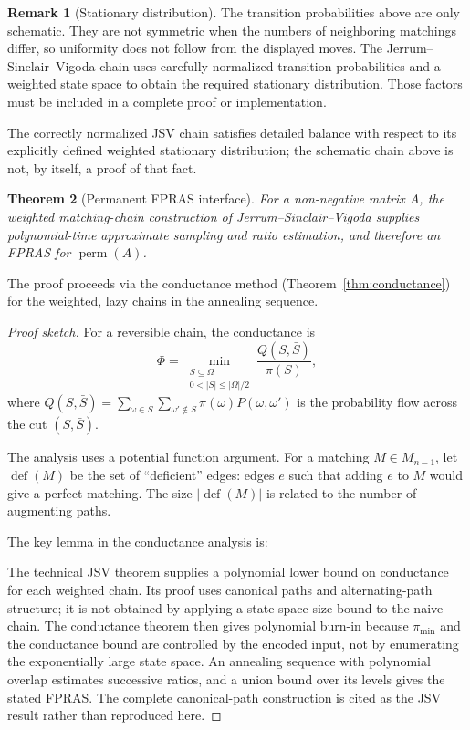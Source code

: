 \documentclass[twoside,12pt]{book}
\theoremstyle{plain}
\newtheorem{theorem}{Theorem}[chapter]
\theoremstyle{definition}
\newtheorem{remark}[theorem]{Remark}
\theoremstyle{remark}
\begin{document}
\begin{remark}[Stationary distribution]
The transition probabilities above are only schematic. They are not symmetric
when the numbers of neighboring matchings differ, so uniformity does not
follow from the displayed moves. The Jerrum--Sinclair--Vigoda chain uses
carefully normalized transition probabilities and a weighted state space to
obtain the required stationary distribution. Those factors must be included
in a complete proof or implementation.
\end{remark}

The correctly normalized JSV chain satisfies detailed balance with respect to
its explicitly defined weighted stationary distribution; the schematic chain
above is not, by itself, a proof of that fact.

\begin{theorem}[Permanent FPRAS interface]
\label{thm:jsv-mixing}
For a non-negative matrix $A$, the weighted matching-chain construction of
Jerrum--Sinclair--Vigoda supplies polynomial-time approximate sampling and
ratio estimation, and therefore an FPRAS for $\operatorname{perm}(A)$.
\end{theorem}

The proof proceeds via the conductance method (Theorem~\ref{thm:conductance})
for the weighted, lazy chains in the annealing sequence.

\begin{proof}[Proof sketch]
For a reversible chain, the conductance is
\[
\Phi = \min_{\substack{S \subseteq \Omega \\ 0 < |S| \leq |\Omega|/2}} \frac{Q(S, \bar{S})}{\pi(S)},
\]
where $Q(S, \bar{S}) = \sum_{\omega \in S} \sum_{\omega' \notin S} \pi(\omega) P(\omega, \omega')$ is the probability flow across the cut $(S, \bar{S})$.

The analysis uses a potential function argument. For a matching $M \in M_{n-1}$, let $\operatorname{def}(M)$ be the set of ``deficient'' edges: edges $e$ such that adding $e$ to $M$ would give a perfect matching. The size $|\operatorname{def}(M)|$ is related to the number of augmenting paths.

The key lemma in the conductance analysis is:

The technical JSV theorem supplies a polynomial lower bound on conductance for
each weighted chain. Its proof uses canonical paths and alternating-path
structure; it is not obtained by applying a state-space-size bound to the
naive chain. The conductance theorem then gives polynomial burn-in because
$\pi_{\min}$ and the conductance bound are controlled by the encoded input,
not by enumerating the exponentially large state space. An annealing sequence
with polynomial overlap estimates successive ratios, and a union bound over
its levels gives the stated FPRAS. The complete canonical-path construction
is cited as the JSV result rather than reproduced here.
\end{proof}
\end{document}
